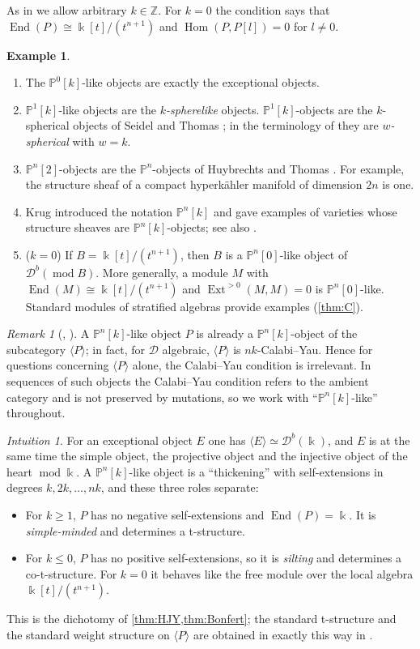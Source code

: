 \documentclass[11pt,reqno]{amsart}
\theoremstyle{plain}
\theoremstyle{definition}
\newtheorem{example}[theorem]{Example}
\theoremstyle{remark}
\newtheorem{remark}[theorem]{Remark}
\newtheorem*{intuition}{Intuition}
\newcommand{\kk}{\Bbbk}
\DeclareMathOperator{\Hom}{Hom}
\DeclareMathOperator{\End}{End}
\DeclareMathOperator{\Ext}{Ext}
\newcommand{\modd}{\operatorname{mod}}
\newcommand{\Db}{\mathcal{D}^b}
\newcommand{\thick}[1]{\langle #1\rangle}
\newcommand{\Pn}[2]{\mathbb{P}^{#1}[#2]}
\newcommand{\cD}{\mathcal{D}}
\begin{document}
As in \cite{Bonf26} we allow arbitrary $k\in\mathbb{Z}$. For $k=0$ the condition says that $\End(P)\cong\kk[t]/(t^{n+1})$ and $\Hom(P,P[l])=0$ for $l\ne0$.

\begin{example}\label{ex:Pnk}
\leavevmode
\begin{enumerate}
\item The $\Pn0k$-like objects are exactly the exceptional objects.
\item $\Pn1k$-like objects are the \emph{$k$-spherelike} objects. $\Pn1k$-objects are the $k$-spherical objects of Seidel and Thomas \cite{ST01}; in the terminology of \cite{HJY13} they are \emph{$w$-spherical} with $w=k$.
\item $\Pn n2$-objects are the $\mathbb{P}^n$-objects of Huybrechts and Thomas \cite{HT06}. For example, the structure sheaf of a compact hyperk\"ahler manifold of dimension $2n$ is one.
\item Krug \cite{Kru18} introduced the notation $\Pn nk$ and gave examples of varieties whose structure sheaves are $\Pn nk$-objects; see also \cite{HK19}.
\item ($k=0$) If $B=\kk[t]/(t^{n+1})$, then $B$ is a $\Pn n0$-like object of $\Db(\modd B)$. More generally, a module $M$ with $\End(M)\cong\kk[t]/(t^{n+1})$ and $\Ext^{>0}(M,M)=0$ is $\Pn n0$-like. Standard modules of stratified algebras provide examples (\cref{thm:C}).
\end{enumerate}
\end{example}

\begin{remark}[{\cite[Rem.~2.2]{HK19}, \cite[Lemma~2.5]{Bonf26}}]
A $\Pn nk$-like object $P$ is already a $\Pn nk$-object of the subcategory $\thick P$; in fact, for $\cD$ algebraic, $\thick P$ is $nk$-Calabi--Yau. Hence for questions concerning $\thick P$ alone, the Calabi--Yau condition is irrelevant. In sequences of such objects the Calabi--Yau condition refers to the ambient category and is not preserved by mutations, so we work with ``$\Pn nk$-like'' throughout.
\end{remark}

\begin{intuition}
For an exceptional object $E$ one has $\thick E\simeq\Db(\kk)$, and $E$ is at the same time the simple object, the projective object and the injective object of the heart $\modd\kk$. A $\Pn nk$-like object is a ``thickening'' with self-extensions in degrees $k,2k,\dots,nk$, and these three roles separate:
\begin{itemize}
\item For $k\ge1$, $P$ has no negative self-extensions and $\End(P)=\kk$. It is \emph{simple-minded} and determines a t-structure.
\item For $k\le0$, $P$ has no positive self-extensions, so it is \emph{silting} and determines a co-t-structure. For $k=0$ it behaves like the free module over the local algebra $\kk[t]/(t^{n+1})$.
\end{itemize}
This is the dichotomy of \cref{thm:HJY,thm:Bonfert}; the standard t-structure and the standard weight structure on $\thick P$ are obtained in exactly this way in \cite[\S3.2]{Bonf26}.
\end{intuition}
\end{document}

